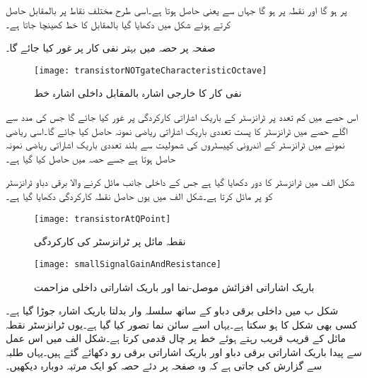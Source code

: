  پر   ہو گا اور  نقطہ  پر ہو گا جہاں سے  یعنی  حاصل ہوتا ہے۔اسی طرح مختلف نقاط پر  بالمقابل  حاصل کرتے ہوئے شکل  میں دکھایا گیا   بالمقابل  کا خط کھینچا جاتا ہے۔

صفحہ  پر حصہ  میں بہتر نفی کار پر غور کیا جائے گا۔
\begin{figure}
\centering
\texttt{[image: transistorNOTgateCharacteristicOctave]}
\caption{نفی کار کا خارجی اشارہ  بالمقابل داخلی اشارہ خط}
\label{شکل_ٹرانزسٹر_نفی_کار_مکمل_خط}
\end{figure}
  اس حصے میں کم تعدد پر ٹرانزسٹر  کے باریک اشاراتی کارکردگی پر غور کیا جائے گا جس کی مدد سے اگلے حصے میں ٹرانزسٹر کا پست تعددی باریک اشاراتی ریاضی نمونہ حاصل کیا جائے گا۔اسی ریاضی نمونے میں ٹرانزسٹر کے اندرونی کپیسٹروں کی شمولیت سے بلند تعددی باریک اشاراتی ریاضی نمونہ حاصل ہوتا ہے جسے  حصہ  میں حاصل کیا گیا ہے۔ 

شکل  الف میں ٹرانزسٹر کا دور دکھایا گیا ہے جس کے داخلی جانب مائل کرنے والا برقی دباو ٹرانزسٹر کو   پر مائل کرتا ہے۔شکل  الف میں یوں حاصل نقطہ کارکردگی   دکھایا گیا ہے۔
\begin{figure}
\centering
\texttt{[image: transistorAtQPoint]}
\caption{نقطہ مائل پر ٹرانزسٹر کی کارکردگی}
\label{شکل_نکتہ_مائل_پر_ٹرانزسٹر_کی_کارکردگی}
\end{figure}
%
\begin{figure}
\centering
\texttt{[image: smallSignalGainAndResistance]}
\caption{باریک اشاراتی افزائش موصل-نما اور باریک اشاراتی داخلی مزاحمت}
\label{شکل_باریک_اشاراتی_موصلیت_نما_اور_مزاحمت}
\end{figure}
شکل  ب میں داخلی برقی دباو  کے ساتھ سلسلہ وار بدلتا باریک اشارہ  جوڑا گیا ہے۔  کسی بھی شکل کا ہو سکتا ہے۔یہاں اسے سائن نما تصور کیا گیا ہے۔یوں ٹرانزسٹر نقطہ مائل کے قریب قریب رہتے ہوئے خط   پر چال قدمی کرتا ہے۔شکل   الف میں اس عمل سے پیدا باریک اشاراتی برقی دباو   اور باریک اشاراتی برقی رو  دکھائے گئے ہیں۔یہاں طلبہ سے گزارش کی جاتی ہے کہ وہ صفحہ \pageref{حصہ_کارتیسی_محدد_اور_ترسیم}  پر دئے حصہ  کو ایک مرتبہ دوبارہ دیکھیں۔

